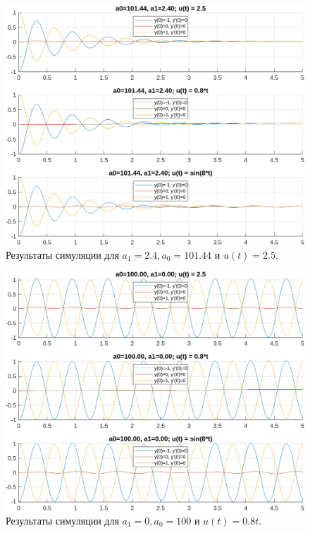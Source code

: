 \begin{figure}
    \centering
    \includegraphics[width=1\textwidth]{figs/task_1_out_1.png}
    \caption{Результаты симуляции для $a_1 = 2.4, a_0 = 101.44$ и $u(t) = 2.5$.}
    \label{fig:task_1_out_1}
\end{figure}

\begin{figure}
    \centering
    \includegraphics[width=1\textwidth]{figs/task_1_out_2.png}
    \caption{Результаты симуляции для $a_1 = 0, a_0 = 100$ и $u(t) = 0.8t$.}
    \label{fig:task_1_out_2}
\end{figure}

